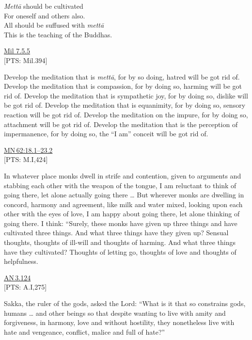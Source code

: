 \documentclass[10pt, openright]{book}
\begin{document}
\begin{itemize}


\textit{Mettā} should be cultivated \\ 
For oneself and others also. \\ 
All should be suffused with \textit{mettā} \\ 
This is the teaching of the Buddhas.


\end{itemize}
\begin{flushright}
\href{https://suttacentral.net/mil7.5.5/en/tw_rhysdavids}{Mil 7.5.5}\\

[PTS: Mil.394]


\end{flushright}
Develop the meditation that is \textit{mettā}, for by so doing, hatred will be got rid of. Develop the meditation that is compassion, for by doing so, harming will be got rid of. Develop the meditation that is sympathetic joy, for by doing so, dislike will be got rid of. Develop the meditation that is equanimity, for by doing so, sensory reaction will be got rid of. Develop the meditation on the impure, for by doing so, attachment will be got rid of. Develop the meditation that is the perception of impermanence, for by doing so, the “I am” conceit will be got rid of.


\begin{flushright}
\href{https://suttacentral.net/mn62/en/sujato\#18.1}{MN 62:18.1–23.2}\\

[PTS: M.I,424]


\end{flushright}
In whatever place monks dwell in strife and contention, given to arguments and stabbing each other with the weapon of the tongue, I am reluctant to think of going there, let alone actually going there … But wherever monks are dwelling in concord, harmony and agreement, like milk and water mixed, looking upon each other with the eyes of love, I am happy about going there, let alone thinking of going there. I think: “Surely, these monks have given up three things and have cultivated three things. And what three things have they given up? Sensual thoughts, thoughts of ill-will and thoughts of harming. And what three things have they cultivated? Thoughts of letting go, thoughts of love and thoughts of helpfulness.


\begin{flushright}
\href{https://suttacentral.net/an3.124/en/sujato}{AN 3.124}\\

[PTS: A.I,275]


\end{flushright}
Sakka, the ruler of the gods, asked the Lord: “What is it that so constrains gods, humans … and other beings so that despite wanting to live with amity and forgiveness, in harmony, love and without hostility, they nonetheless live with hate and vengeance, conflict, malice and full of hate?”
\end{document}

